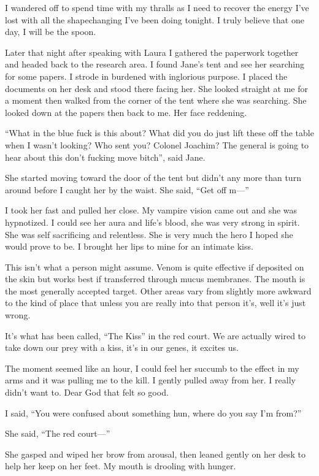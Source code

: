 I wandered off to spend time with my thralls as I need to recover the energy I've lost with all the shapechanging I've been doing tonight. I truly believe that one day, I will be the spoon.

\parasep

Later that night after speaking with Laura I gathered the paperwork together and headed back to the research area. I found Jane's tent and see her searching for some papers. I strode in burdened with inglorious purpose. I placed the documents on her desk and stood there facing her. She looked straight at me for a moment then walked from the corner of the tent where she was searching. She looked down at the papers then back to me. Her face reddening.

``What in the blue fuck is this about? What did you do just lift these off the table when I wasn't looking? Who sent you? Colonel Joachim? The general is going to hear about this don't fucking move bitch'', said Jane.

She started moving toward the door of the tent but didn't any more than turn around before I caught her by the waist. She said, ``Get off m---''

I took her fast and pulled her close. My vampire vision came out and she was hypnotized. I could see her aura and life's blood, she was very strong in spirit. She was self sacrificing and relentless. She is very much the hero I hoped she would prove to be. I brought her lips to mine for an intimate kiss. 

This isn't what a person might assume. Venom is quite effective if deposited on the skin but works best if transferred through mucus membranes. The mouth is the most generally accepted target. Other areas vary from slightly more awkward to the kind of place that unless you are really into that person it's, well it's just wrong.

It's what has been called, ``The Kiss'' in the red court. We are actually wired to take down our prey with a kiss, it's in our genes, it excites us.

The moment seemed like an hour, I could feel her succumb to the effect in my arms and it was pulling me to the kill. I gently pulled away from her. I really didn't want to. Dear God that felt so good.

I said, ``You were confused about something hun, where do you say I'm from?''

She said, ``The red court---''

She gasped and wiped her brow from arousal, then leaned gently on her desk to help her keep on her feet. My mouth is drooling with hunger.

